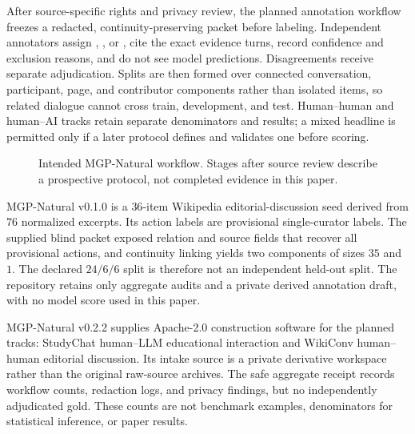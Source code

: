 After source-specific rights and privacy review, the planned annotation workflow
freezes a redacted, continuity-preserving packet before labeling. Independent
annotators assign \keep, \supersede, or \abstain, cite the exact evidence turns,
record confidence and exclusion reasons, and do not see model predictions.
Disagreements receive separate adjudication. Splits are then formed over connected
conversation, participant, page, and contributor components rather than isolated
items, so related dialogue cannot cross train, development, and test. Human--human
and human--AI tracks retain separate denominators and results; a mixed headline
is permitted only if a later protocol defines and validates one before scoring.

\begin{figure}[!h]
\centering
{}
\caption{Intended MGP-Natural workflow. Stages after source review describe a
prospective protocol, not completed evidence in this paper.}
\label{fig:mgp-natural-workflow}
\end{figure}

MGP-Natural v0.1.0 is a $36$-item Wikipedia editorial-discussion
seed derived from $76$ normalized excerpts. Its action labels are provisional
single-curator labels. The supplied blind packet exposed relation and source
fields that recover all provisional actions, and continuity linking yields two
components of sizes $35$ and $1$. The declared $24/6/6$ split is therefore not
an independent held-out split. The repository retains only aggregate audits and
a private derived annotation draft, with no model score used in this paper.

MGP-Natural v0.2.2 supplies Apache-2.0 construction software for the planned
tracks: StudyChat human--LLM educational interaction and WikiConv human--human
editorial discussion. Its intake source is a private derivative workspace rather than the
original raw-source archives. The safe aggregate receipt records workflow
counts, redaction logs, and privacy findings, but no independently adjudicated
gold. These counts are not benchmark examples, denominators for statistical
inference, or paper results.

